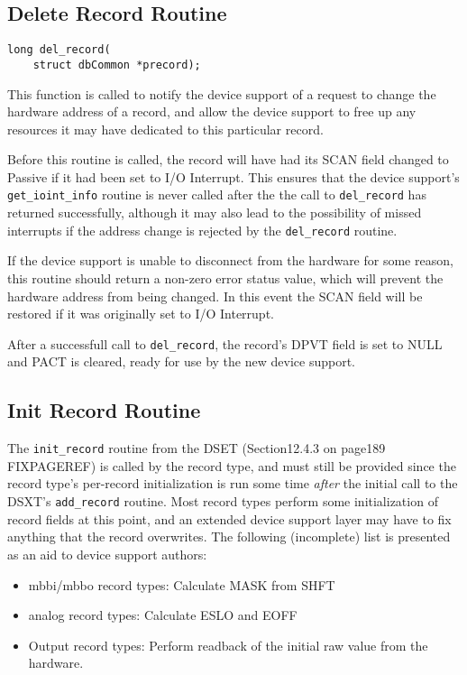 \subsection{Delete Record Routine}

\begin{verbatim}long del_record(
    struct dbCommon *precord);
\end{verbatim}This function is called to notify the device support of a request to change the hardware address of a record, and allow the 
device support to free up any resources it may have dedicated to this particular record.

Before this routine is called, the record will have had its SCAN field changed to Passive if it had been set to I/O Interrupt. 
This ensures that the device support's \verb|get_ioint_info| routine is never called after the the call to \verb|del_record| has 
returned successfully, although it may also lead to the possibility of missed interrupts if the address change is rejected by 
the \verb|del_record| routine.

If the device support is unable to disconnect from the hardware for some reason, this routine should return a non-zero 
error status value, which will prevent the hardware address from being changed. In this event the SCAN field will be 
restored if it was originally set to I/O Interrupt.

After a successfull call to \verb|del_record|, the record's DPVT field is set to NULL and PACT is cleared, ready for use by 
the new device support.

\subsection{Init Record Routine}

The \verb|init_record| routine from the DSET (Section12.4.3 on page189 FIXPAGEREF) is called by the record type, and must still be 
provided since the record type's per-record initialization is run some time \emph{after} the initial call to the DSXT's 
\verb|add_record| routine. Most record types perform some initialization of record fields at this point, and an extended device 
support layer may have to fix anything that the record overwrites. The following (incomplete) list is presented as an aid to 
device support authors:

\begin{itemize}\item mbbi/mbbo record types: Calculate MASK from SHFT

\item analog record types: Calculate ESLO and EOFF

\item Output record types: Perform readback of the initial raw value from the hardware.

\end{itemize}








